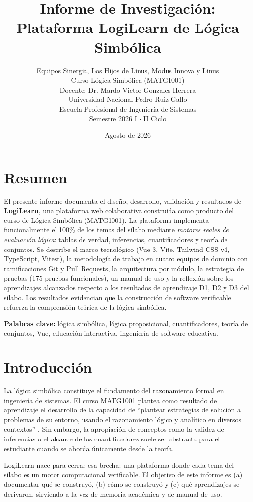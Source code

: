 \documentclass[12pt,a4paper]{article}
\title{\textbf{Informe de Investigación: Plataforma LogiLearn de Lógica Simbólica}}
\author{
  Equipos Sinergia, Los Hijos de Linus, Modus Innova y Linus \\
  Curso Lógica Simbólica (MATG1001) \\
  Docente: Dr. Mardo Victor Gonzales Herrera \\
  Universidad Nacional Pedro Ruiz Gallo \\
  Escuela Profesional de Ingeniería de Sistemas \\
  Semestre 2026 I $\cdot$ II Ciclo
}
\date{Agosto de 2026}
\begin{document}
\maketitle

\section*{Resumen}
El presente informe documenta el diseño, desarrollo, validación y resultados de \textbf{LogiLearn}, una
plataforma web colaborativa construida como producto del curso de Lógica Simbólica (MATG1001). La
plataforma implementa funcionalmente el 100\% de los temas del sílabo mediante \textit{motores reales
de evaluación lógica}: tablas de verdad, inferencias, cuantificadores y teoría de conjuntos. Se
describe el marco tecnológico (Vue 3, Vite, Tailwind CSS v4, TypeScript, Vitest), la metodología de
trabajo en cuatro equipos de dominio con ramificaciones Git y Pull Requests, la arquitectura por
módulo, la estrategia de pruebas (175 pruebas funcionales), un manual de uso y la reflexión sobre los
aprendizajes alcanzados respecto a los resultados de aprendizaje D1, D2 y D3 del sílabo. Los
resultados evidencian que la construcción de software verificable refuerza la comprensión teórica de
la lógica simbólica.

\textbf{Palabras clave:} lógica simbólica, lógica proposicional, cuantificadores, teoría de conjuntos,
Vue, educación interactiva, ingeniería de software educativa.

\newpage

\section{Introducción}
La lógica simbólica constituye el fundamento del razonamiento formal en ingeniería de sistemas. El
curso MATG1001 plantea como resultado de aprendizaje el desarrollo de la capacidad de ``plantear
estrategias de solución a problemas de su entorno, usando el razonamiento lógico y analítico en
diversos contextos'' \cite{silabo}. Sin embargo, la apropiación de conceptos como la validez de
inferencias o el alcance de los cuantificadores suele ser abstracta para el estudiante cuando se
aborda únicamente desde la teoría.

LogiLearn nace para cerrar esa brecha: una plataforma donde cada tema del sílabo es un motor
computacional verificable. El objetivo de este informe es (a) documentar qué se construyó, (b) cómo
se construyó y (c) qué aprendizajes se derivaron, sirviendo a la vez de memoria académica y de manual
de uso.
\end{document}
